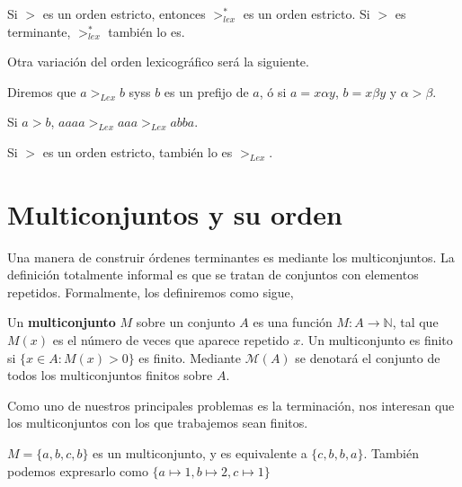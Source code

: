 \begin{lema}
  Si $>$ es un orden estricto, entonces $>^*_{lex}$ es un orden estricto. Si $>$ es
  terminante, $>^*_{lex}$ también lo es.
\end{lema}

Otra variación del orden lexicográfico será la siguiente.

\begin{defi}
  Diremos que $a >_{Lex} b$ syss $b$ es un prefijo de $a$, ó si
  $a = x \alpha y$, $b = x \beta y$ y $\alpha > \beta$.
\end{defi}

\begin{ejem}
  Si $a>b$, $aaaa >_{Lex} aaa >_{Lex} abba$.
\end{ejem}

\begin{lema}
  Si $>$ es un orden estricto, también lo es $>_{Lex}$.
\end{lema}

\section{Multiconjuntos y su orden}\label{ormult}

Una manera de construir órdenes terminantes es mediante los multiconjuntos. La
definición totalmente informal es que se tratan de conjuntos con elementos
repetidos. Formalmente, los definiremos como sigue,

\begin{defi}
  Un \textbf{multiconjunto} $M$ sobre un conjunto $A$ es una función
  $M : A \rightarrow \mathbb{N}$, tal que $M(x)$ es el número de veces que
  aparece repetido $x$. Un multiconjunto es finito si $\{x \in A : M(x) > 0\}$
  es finito. Mediante $\mathcal{M}(A)$ se denotará el conjunto de todos los
  multiconjuntos finitos sobre $A$.
\end{defi}

Como uno de nuestros principales problemas es la terminación, nos interesan que
los multiconjuntos con los que trabajemos sean finitos.

\begin{ejem} 
  $M = \{a,b,c,b\}$ es un multiconjunto, y es equivalente a
  $\{c,b,b,a\}$. También podemos expresarlo como
  $\{a\mapsto 1, b \mapsto 2, c\mapsto 1\}$
\end{ejem}

